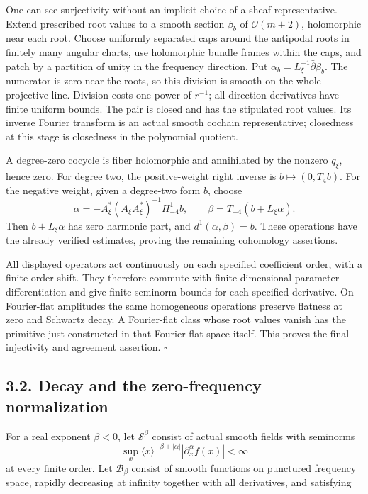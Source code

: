 \documentclass[
  english,
  11pt,
  reqno]{amsart}
\begin{document}
One can see surjectivity without an implicit choice of a sheaf
representative. Extend prescribed root values to a smooth section
\(\beta_b\) of \(\mathcal O(m+2)\), holomorphic near each root. Choose
uniformly separated caps around the antipodal roots in finitely many
angular charts, use holomorphic bundle frames within the caps, and patch
by a partition of unity in the frequency direction. Put
\(\alpha_b=L_\xi^{-1}\bar\partial\beta_b\). The numerator is zero near
the roots, so this division is smooth on the whole projective line.
Division costs one power of \(r^{-1}\); all direction derivatives have
finite uniform bounds. The pair is closed and has the stipulated root
values. Its inverse Fourier transform is an actual smooth cochain
representative; closedness at this stage is closedness in the polynomial
quotient.

A degree-zero cocycle is fiber holomorphic and annihilated by the
nonzero \(q_\xi\), hence zero. For degree two, the positive-weight right
inverse is \(b\mapsto(0,T_4b)\). For the negative weight, given a
degree-two form \(b\), choose \[
\alpha=-A_\xi^*(A_\xi A_\xi^*)^{-1}H_{-4}^1b,
\qquad
\beta=T_{-4}(b+L_\xi\alpha).
\] Then \(b+L_\xi\alpha\) has zero harmonic part, and
\(d^1(\alpha,\beta)=b\). These operations have the already verified
estimates, proving the remaining cohomology assertions.

All displayed operators act continuously on each specified coefficient
order, with a finite order shift. They therefore commute with
finite-dimensional parameter differentiation and give finite seminorm
bounds for each specified derivative. On Fourier-flat amplitudes the
same homogeneous operations preserve flatness at zero and Schwartz
decay. A Fourier-flat class whose root values vanish has the primitive
just constructed in that Fourier-flat space itself. This proves the
final injectivity and agreement assertion. \hfill\(\square\)

\subsection{3.2. Decay and the zero-frequency
normalization}\label{decay-and-the-zero-frequency-normalization}\label{sec:online-root-weighted-fourier}

For a real exponent \(\beta<0\), let \(\mathscr S^\beta\) consist of
actual smooth fields with seminorms \[
\sup_x\langle x\rangle^{-\beta+|\alpha|}
|\partial_x^\alpha f(x)|<\infty
\] at every finite order. Let \(\mathscr B_\beta\) consist of smooth
functions on punctured frequency space, rapidly decreasing at infinity
together with all derivatives, and satisfying
\end{document}
